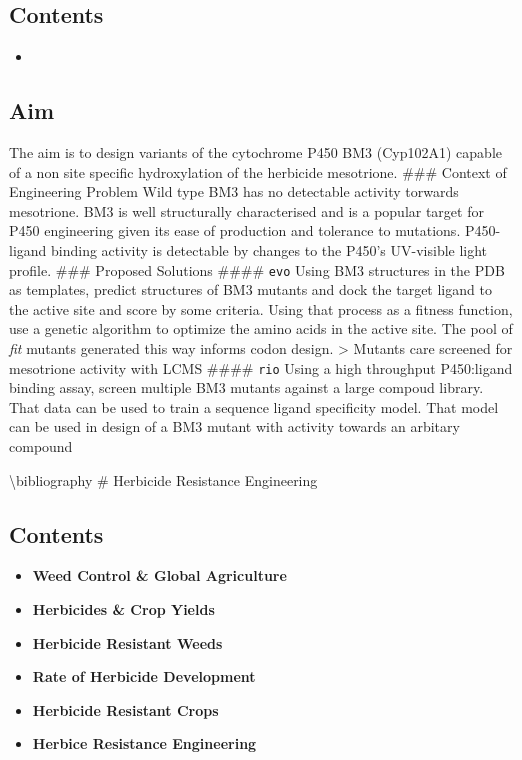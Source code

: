 \hypertarget{contents-1}{%
\subsection{Contents}\label{contents-1}}

\begin{itemize}
\tightlist
\item
  \protect\hyperlink{}{}
\end{itemize}

\hypertarget{aim}{%
\subsection{Aim}\label{aim}}

The aim is to design variants of the cytochrome P450 BM3 (Cyp102A1)
capable of a non site specific hydroxylation of the herbicide
mesotrione. \#\#\# Context of Engineering Problem Wild type BM3 has no
detectable activity torwards mesotrione. BM3 is well structurally
characterised and is a popular target for P450 engineering given its
ease of production and tolerance to mutations. P450-ligand binding
activity is detectable by changes to the P450's UV-visible light
profile. \#\#\# Proposed Solutions \#\#\#\# \texttt{evo} Using BM3
structures in the PDB as templates, predict structures of BM3 mutants
and dock the target ligand to the active site and score by some
criteria. Using that process as a fitness function, use a genetic
algorithm to optimize the amino acids in the active site. The pool of
\emph{fit} mutants generated this way informs codon design.
\textgreater{} Mutants care screened for mesotrione activity with LCMS
\#\#\#\# \texttt{rio} Using a high throughput P450:ligand binding assay,
screen multiple BM3 mutants against a large compoud library. That data
can be used to train a sequence ligand specificity model. That model can
be used in design of a BM3 mutant with activity towards an arbitary
compound

\textbackslash bibliography \# Herbicide Resistance Engineering

\hypertarget{contents-2}{%
\subsection{Contents}\label{contents-2}}

\begin{itemize}
\tightlist
\item
  \textbf{Weed Control \& Global Agriculture}
\item
  \textbf{Herbicides \& Crop Yields}
\item
  \textbf{Herbicide Resistant Weeds}
\item
  \textbf{Rate of Herbicide Development}
\item
  \textbf{Herbicide Resistant Crops}
\item
  \textbf{Herbice Resistance Engineering}
\end{itemize}

